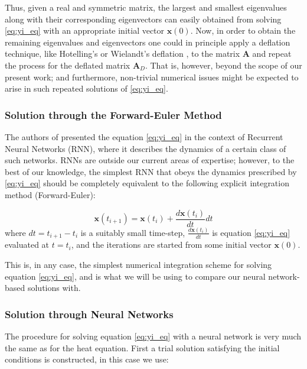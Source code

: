 \documentclass[reprint, english, nofootinbib]{revtex4-2}
\begin{document}
Thus, given a real and symmetric matrix, the largest and smallest eigenvalues along with their corresponding eigenvectors can easily obtained from solving \ref{eq:yi_eq} with an appropriate initial vector $\mathbf{x}(0)$. Now, in order to obtain the remaining eigenvalues and eigenvectors one could in principle apply a deflation technique, like Hotelling's or Wielandt's deflation \cite{Saad_2011} \cite{Roberts}, to the matrix $\mathbf{A}$ and repeat the process for the deflated matrix $\mathbf{A}_D$. That is, however, beyond the scope of our present work; and furthermore, non-trivial numerical issues might be expected to arise in such repeated solutions of \ref{eq:yi_eq}.

\subsubsection{Solution through the Forward-Euler Method}

The authors of \cite{Yi_2004} presented the equation \ref{eq:yi_eq} in the context of Recurrent Neural Networks (RNN), where it describes the dynamics of a certain class of such networks. RNNs are outside our current areas of expertise; however, to the best of our knowledge, the simplest RNN that obeys the dynamics prescribed by \ref{eq:yi_eq} should be completely equivalent to the following explicit integration method (Forward-Euler):

\begin{equation}
\label{eq:yi_euler}
\mathbf{x}(t_{i+1}) = \mathbf{x}(t_i) + \frac{d \mathbf{x}(t_i)}{dt}  dt
\end{equation}
where $dt = t_{i+1} -t_{i}$ is a suitably small time-step,  $\frac{d \mathbf{x}(t_i)}{dt}$ is equation \ref{eq:yi_eq} evaluated at $t=t_i$, and the iterations are started from some initial vector $\mathbf{x}(0)$.

This is, in any case, the simplest numerical integration scheme for solving equation \ref{eq:yi_eq}, and is what we will be using to compare our neural network-based solutions with.

\subsubsection{Solution through Neural Networks}

The procedure for solving equation \ref{eq:yi_eq} with a neural network is very much the same as for the heat equation. First a trial solution satisfying the initial conditions is constructed, in this case we use:
\end{document}
